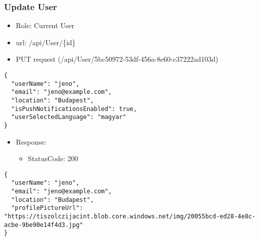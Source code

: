 \documentclass[11pt]{article}
\begin{document}
\subsubsection{Update User}
\label{sec:org95402be}
\begin{itemize}
\item Role: Current User
\item url: /api/User/\{id\}
\item PUT request (/api/User/5bc50972-53df-456a-8e60-c37222ad103d)
\end{itemize}
\begin{verbatim}
{
  "userName": "jeno",
  "email": "jeno@example.com",
  "location": "Budapest",
  "isPushNotificationsEnabled": true,
  "userSelectedLanguage": "magyar"
}
\end{verbatim}
\begin{itemize}
\item Response:
\begin{itemize}
\item StatusCode: 200
\end{itemize}
\end{itemize}
\begin{verbatim}
{
  "userName": "jeno",
  "email": "jeno@example.com",
  "location": "Budapest",
  "profilePictureUrl": "https://tiszolczijacint.blob.core.windows.net/img/20055bcd-ed28-4e8c-acbe-9be90e14f4d3.jpg"
}
\end{verbatim}
\end{document}
